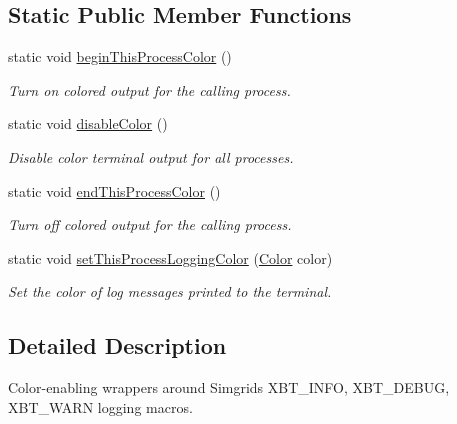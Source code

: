 \subsection*{Static Public Member Functions}
\begin{DoxyCompactItemize}
\item 
\mbox{\label{classwrench_1_1_terminal_output_ad0b1974420fc4f0ba6eff293f6b2756c}} 
static void \hyperlink{classwrench_1_1_terminal_output_ad0b1974420fc4f0ba6eff293f6b2756c}{begin\+This\+Process\+Color} ()
\begin{DoxyCompactList}\small\item\em Turn on colored output for the calling process. \end{DoxyCompactList}\item 
\mbox{\label{classwrench_1_1_terminal_output_a77b3b0be090defaef3a56d8f98e1e68b}} 
static void \hyperlink{classwrench_1_1_terminal_output_a77b3b0be090defaef3a56d8f98e1e68b}{disable\+Color} ()
\begin{DoxyCompactList}\small\item\em Disable color terminal output for all processes. \end{DoxyCompactList}\item 
\mbox{\label{classwrench_1_1_terminal_output_ad679829c47cacece6c79de8bba45add8}} 
static void \hyperlink{classwrench_1_1_terminal_output_ad679829c47cacece6c79de8bba45add8}{end\+This\+Process\+Color} ()
\begin{DoxyCompactList}\small\item\em Turn off colored output for the calling process. \end{DoxyCompactList}\item 
static void \hyperlink{classwrench_1_1_terminal_output_a07c9d9aaefaf7d79fc2cafaa92162813}{set\+This\+Process\+Logging\+Color} (\hyperlink{classwrench_1_1_terminal_output_a793daa5c24c3613b398f801a75bfa1e0}{Color} color)
\begin{DoxyCompactList}\small\item\em Set the color of log messages printed to the terminal. \end{DoxyCompactList}\end{DoxyCompactItemize}


\subsection{Detailed Description}
Color-\/enabling wrappers around Simgrid\textquotesingle{}s X\+B\+T\+\_\+\+I\+N\+FO, X\+B\+T\+\_\+\+D\+E\+B\+UG, X\+B\+T\+\_\+\+W\+A\+RN logging macros. 

